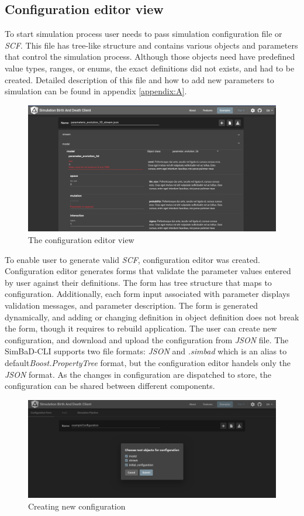 \subsection{Configuration editor view}
To start simulation process user needs to pass simulation configuration file or \textit{SCF}. This file has tree-like structure and contains various objects and parameters that control the simulation process. Although those objects need have predefined value types, ranges, or enums, the exact definitions did not exists, and had to be created. Detailed description of this file and how to add new parameters to simulation can be found in appendix \ref{appendix:A}.
\begin{figure}[h!]
	\centering
		\includegraphics[width=0.9\linewidth]{screens/conf-view.png}
	\caption{The configuration editor view}
	\label{fig:conf-view}
\end{figure}
To enable user to generate valid \textit{SCF}, configuration editor was created. Configuration editor generates forms that validate the parameter values entered by user against their definitions. The form has tree structure that maps to configuration. Additionally, each form input associated with parameter displays validation messages, and parameter description. The form is generated dynamically, and adding or changing definition in object definition does not break the form, though it requires to rebuild application. The user can create new configuration, and download and upload the configuration from \textit{JSON} file. The SimBaD-CLI supports two file formats: \textit{JSON} and \textit{.simbad} which is an alias to default\textit{Boost.PropertyTree} format, but the configuration editor handels only the \textit{JSON} format. As the changes in configuration are dispatched to store, the configuration can be shared between different components. 
\begin{figure}[h!]
	\centering
		\includegraphics[width=0.9\linewidth]{screens/configuration-view-modal.png}
	\caption{Creating new configuration}
	\label{fig:conf-view-new}
\end{figure}
